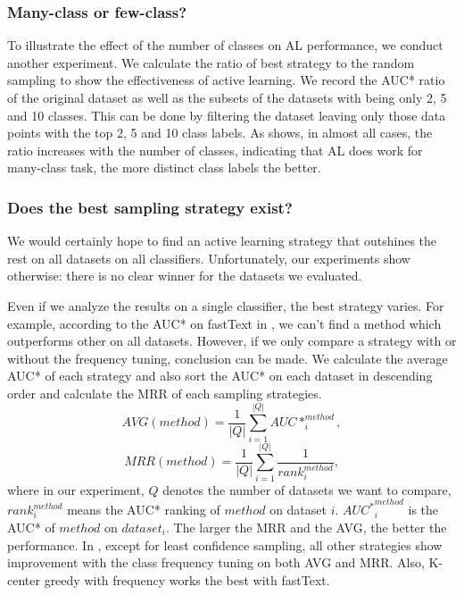 \subsubsection{Many-class or few-class?}
To illustrate the effect of the number of classes on AL performance, 
we conduct another experiment. We calculate the ratio of best strategy to 
the random sampling to show the effectiveness of active learning. 
We record the AUC* ratio of the original dataset as well as the subsets 
of the datasets with being only 2, 5 and 10 classes. This can be done by
filtering the dataset leaving only those data points with the top 2, 5 and 10 
class labels. 
As  shows, in almost all cases, 
the ratio increases with the number of classes, indicating that AL does work 
for many-class task, the more distinct class labels the better.

\subsubsection{Does the best sampling strategy exist?}
We would certainly hope to find an active learning strategy 
that outshines the rest on all datasets on all classifiers. 
Unfortunately, our experiments show otherwise: there is no clear winner 
for the datasets we evaluated. 

Even if we analyze the results on a single classifier, 
the best strategy varies. For example, according to the AUC* on 
fastText in , we can't find a method which outperforms 
other on all datasets.  However, if we only compare a strategy with
or without the frequency tuning, conclusion can be made. We calculate the average AUC* of each strategy and also sort the AUC* on each dataset in 
descending order and calculate the MRR of 
each sampling strategies.
\begin{equation}
    AVG(method) = \frac{1}{|Q|}\sum_{i=1}^{|Q|}AUC*_i^{method},
\end{equation}
\begin{equation}
    MRR(method) = \frac{1}{|Q|}\sum_{i=1}^{|Q|}\frac{1}{rank_i^{method}},
\end{equation}
where in our experiment, $Q$ denotes the number of datasets we want to compare, $rank_i^{method}$ means the AUC* ranking of $method$ on dataset $i$. ${AUC^*}^{method}_{i}$ is the AUC* of $method$ on $dataset_i$.
The larger the MRR and the AVG, the better the performance. In , 
except for least confidence sampling, all other strategies show improvement
with the class frequency tuning on both AVG and MRR.
Also, K-center greedy with frequency works the best with fastText.

